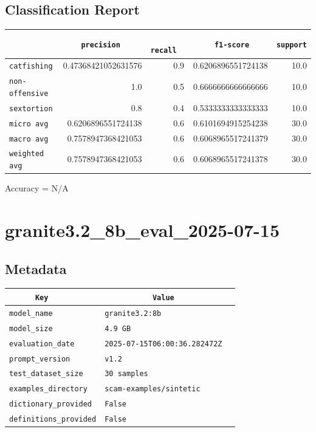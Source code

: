 \documentclass{article}
\begin{document}
\subsection{Classification Report}

\begin{center}
\begin{tabular}{l | r | r | r | r} \hline
    \verb|            | & \verb|    precision     | & \verb|      recall      | & \verb|     f1-score     | & \verb|support| \\ \hline
    \hline
    \verb|catfishing | & 0.47368421052631576 & 0.9 & 0.6206896551724138 &    10.0 \\ \hline
    \verb|non-offensive| & 1.0 & 0.5 & 0.6666666666666666 &    10.0 \\ \hline
    \verb|sextortion | & 0.8 & 0.4 & 0.5333333333333333 &    10.0 \\ \hline
    \verb|micro avg  | & 0.6206896551724138 & 0.6 & 0.6101694915254238 &    30.0 \\ \hline
    \verb|macro avg  | & 0.7578947368421053 & 0.6 & 0.6068965517241379 &    30.0 \\ \hline
    \verb|weighted avg| & 0.7578947368421053 & 0.6 & 0.6068965517241378 &    30.0 \\ \hline
\end{tabular}
\end{center}

\begin{center}
Accuracy = N/A
\end{center}

\section{granite3.2\_8b\_eval\_2025-07-15}
\subsection{Metadata}

\begin{center}
\begin{tabular}{l | l} \hline
    \verb|      Key      | & \verb|           Value           | \\ \hline
    \hline
    \verb|model_name    | & \verb|granite3.2:8b                | \\ \hline
    \verb|model_size    | & \verb|4.9 GB                       | \\ \hline
    \verb|evaluation_date| & \verb|2025-07-15T06:00:36.282472Z  | \\ \hline
    \verb|prompt_version| & \verb|v1.2                         | \\ \hline
    \verb|test_dataset_size| & \verb|30 samples                   | \\ \hline
    \verb|examples_directory| & \verb|scam-examples/sintetic       | \\ \hline
    \verb|dictionary_provided| & \verb|False                        | \\ \hline
    \verb|definitions_provided| & \verb|False                        | \\ \hline
\end{tabular}
\end{center}
\end{document}

